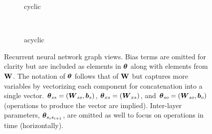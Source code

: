 \begin{figure}[H]
  \centering
  \begin{subfigure}[]{\wd\rnn}
    \begin{center}
      \usebox{\rnn}
    \end{center}
    \caption{cyclic}
    \label{fig:rnn_f}
  \end{subfigure}
  ~
  \begin{subfigure}[]{\wd\rnnuf}
    \begin{center}
      \usebox{\rnnuf}
    \end{center}
    \caption{acyclic}
    \label{fig:rnn_uf}
  \end{subfigure}
  \caption[Recurrent neural network graph views]{
Recurrent neural network graph views. 
Bias terms are omitted for clarity but are included as elements in $\boldsymbol{\theta}$ along with elements from $\mathbf{W}$.
%
The notation of $\boldsymbol{\theta}$ follows that of $\mathbf{W}$ but captures more variables by vectorizing each component for concatenation into a single vector.
%
$\boldsymbol{\theta}_{ss} = (\boldsymbol{W}_{ss},\boldsymbol{b}_s)$, $\boldsymbol{\theta}_{xs} = (\boldsymbol{W}_{xs})$, and $\boldsymbol{\theta}_{so} = (\boldsymbol{W}_{so},\boldsymbol{b}_o)$ (operations to produce the vector are implied).
%
Inter-layer parameters, $\boldsymbol{\theta}_{s_is_{i+1}}$, are omitted as well to focus on operations in time (horizontally).
}
  \label{fig:rnn}
\end{figure}%

